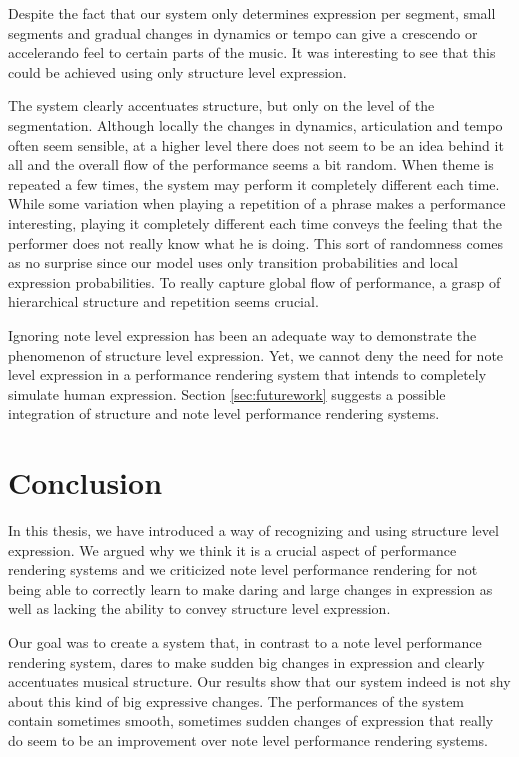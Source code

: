 \documentclass[a4paper,10pt]{article}
\begin{document}
Despite the fact that our system only determines expression per segment, small segments and gradual changes in dynamics or tempo can give a crescendo or accelerando feel to certain parts of the music. It was interesting to see that this could be achieved using only structure level expression.

The system clearly accentuates structure, but only on the level of the segmentation. Although locally the changes in dynamics, articulation and tempo often seem sensible, at a higher level there does not seem to be an idea behind it all and the overall flow of the performance seems a bit random. When theme is repeated a few times, the system may perform it completely different each time. While some variation when playing a repetition of a phrase makes a performance interesting, playing it completely different each time conveys the feeling that the performer does not really know what he is doing. This sort of randomness comes as no surprise since our model uses only transition probabilities and local expression probabilities. To really capture global flow of performance, a grasp of hierarchical structure and repetition seems crucial.

Ignoring note level expression has been an adequate way to demonstrate the phenomenon of structure level expression. Yet, we cannot deny the need for note level expression in a performance rendering system that intends to completely simulate human expression. Section \ref{sec:futurework} suggests a possible integration of structure and note level performance rendering systems.


\section{Conclusion}
\label{sec:conclusion}

In this thesis, we have introduced a way of recognizing and using structure level expression. We argued why we think it is a crucial aspect of performance rendering systems and we criticized  note level performance rendering for not being able to correctly learn to make daring and large changes in expression as well as lacking the ability to convey structure level expression. 

Our goal was to create a system that, in contrast to a note level performance rendering system, dares to make sudden big changes in expression and clearly accentuates musical structure. Our results show that our system indeed is not shy about this kind of big expressive changes. The performances of the system contain sometimes smooth, sometimes sudden changes of expression that really do seem to be an improvement over note level performance rendering systems.%
\end{document}
